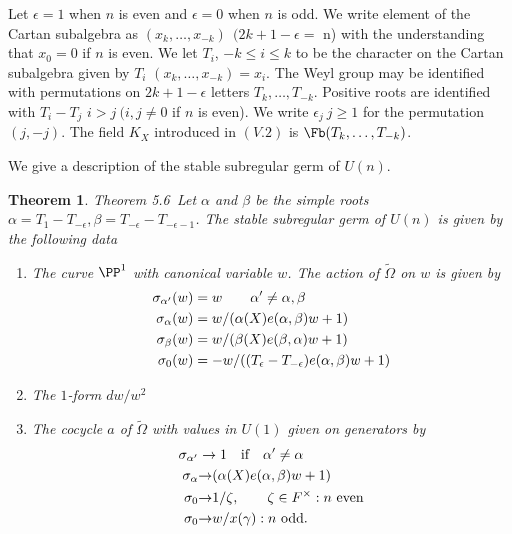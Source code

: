 \documentclass{memo-l}
\newtheorem{theorem}{Theorem}[section]
\theoremstyle{definition}
\theoremstyle{remark}
\numberwithin{section}{chapter}
\numberwithin{equation}{chapter}
\begin{document}
   Let ${\epsilon}  =  1$ when $n$ is even and ${\epsilon}  =  0$ when $n$ is
odd.  We write element of the Cartan subalgebra as $(x_{k},\ldots ,x_{-k})
\ \ (2k+1-{\epsilon}  = $ n) with the understanding that $x_{0}  =  0$ if $n$ is
even.  We let $T_{i}$, $-k  \le i  \le k$ to be the character on the
Cartan subalgebra given by $T_{i}$ $(x_{k},\ldots ,x_{-k})  =  x_{i}$.  The Weyl
group may be identified with permutations on $2k+1-{\epsilon}$ letters
$T_{k},\ldots ,T_{-k}$.  Positive roots are identified with $T_{i}-T_{j}$
 $i > j\  (i,j  \ne  0$ if $n$ is even).  We write ${\epsilon}_{j}\
 j \ge  1$ for
the permutation $(j,-j)$.  The field $K_X$ introduced in $(V.2)$ is $\Fb
(T_{k},\ldots ,T_{-k})$.

   We give a description of the stable subregular germ of $U(n)$.

\setcounter{theorem}{5} %

\begin{theorem}{Theorem 5.6}\ Let ${\alpha}$ and ${\beta}$ be the simple
roots ${\alpha}  =  T_{1}-T_{-{\epsilon}}, {\beta}  = 
T_{-{\epsilon}}-T_{-{\epsilon}-1}$.  The stable subregular germ of $U(n)$
is given by the following data
        \begin{enumerate}[label=\arabic*.]
\item The curve ${\PP}^1$ with canonical variable $w$.  The
action of $\tilde{\Omega}$ on $w$ is given by
$$
\aligned
{\sigma}_{{\alpha}'}(w)  &=  w \qquad {\alpha}' \ne  {\alpha},{\beta} \\
{\sigma}_{{\alpha}}(w)  &=  w/({\alpha}(X)e({\alpha},{\beta})w + 1) \\
{\sigma}_{{\beta}}(w)  &=  w/({\beta}(X)e({\beta},{\alpha})w + 1) \\
{\sigma}_{0}(w)  &= 
-w/((T_{{\epsilon}}-T_{-{\epsilon}})e({\alpha},{\beta})w + 1) 
\endaligned
$$
\item The $1$-form $dw/w^{2}$
\item The cocycle $a$ of $\tilde{\Omega}$ with values in $U(1)$ given on
generators by 
$$
\aligned
\sigma_{\alpha'} &\to 1 \quad \hbox{if}\quad \alpha'\ne\alpha\\
{\sigma}_{{\alpha}} &{\to} ({\alpha}(X)e({\alpha},{\beta})w + 1)\\
{\sigma}_{0} &{\to} 1/{\zeta}, \qquad {\zeta}  \in  F^{\times} : n\ {\text{even}}\\
{\sigma}_{0} &{\to} w/x({\gamma}) : n\ {\text{odd}}.
\endaligned
$$
\end{enumerate}
\end{theorem}
\end{document}
